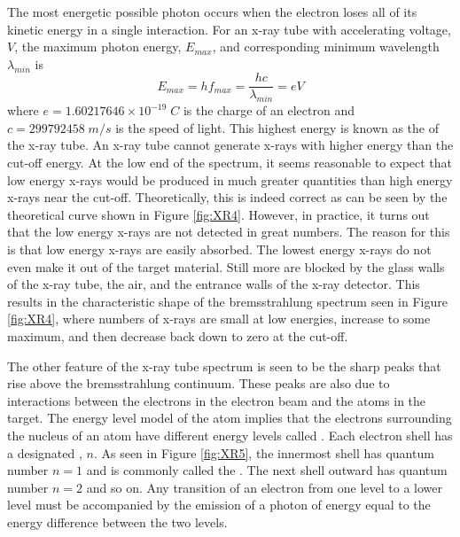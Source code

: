 \documentclass[12pt, a4paper, oneside, openright, titlepage]{book}
\begin{document}
\noindent The most energetic possible photon occurs when the electron loses all of its kinetic energy in a single interaction. For an x-ray tube with accelerating voltage, $V$, the maximum photon energy, $E_{max}$, and corresponding minimum wavelength $\lambda_{min}$ is \begin{equation}\label{eq:XR2}
    E_{max} = hf_{max} = \frac{hc}{\lambda_{min}} = eV
\end{equation}
where $e = 1.60217646\times 10^{-19}\;C$ is the charge of an electron and $c = 299792458\;m/s$ is the speed of light. This highest energy is known as the  of the x-ray tube. An x-ray tube cannot generate x-rays with higher energy than the cut-off energy. At the low end of the spectrum, it seems reasonable to expect that low energy x-rays would be produced in much greater quantities than high energy x-rays near the cut-off. Theoretically, this is indeed correct as can be seen by the theoretical curve shown in Figure \ref{fig:XR4}. However, in practice, it turns out that the low energy x-rays are not detected in great numbers. The reason for this is that low energy x-rays are easily absorbed. The lowest energy x-rays do not even make it out of the target material. Still more are blocked by the glass walls of the x-ray tube, the air, and the entrance walls of the x-ray detector. This results in the characteristic shape of the bremsstrahlung spectrum seen in Figure \ref{fig:XR4}, where numbers of x-rays are small at low energies, increase to some maximum, and then decrease back down to zero at the cut-off. 

\noindent The other feature of the x-ray tube spectrum is seen to be the sharp peaks that rise above the bremsstrahlung continuum. These peaks are also due to interactions between the electrons in the electron beam and the atoms in the target. The energy level model of the atom implies that the electrons surrounding the nucleus of an atom have different energy levels called . Each electron shell has a designated , $n$. As seen in Figure \ref{fig:XR5}, the innermost shell has quantum number $n=1$ and is commonly called the . The next shell outward has quantum number $n=2$ and so on. Any transition of an electron from one level to a lower level must be accompanied by the emission of a photon of energy equal to the energy difference between the two levels.
\end{document}
